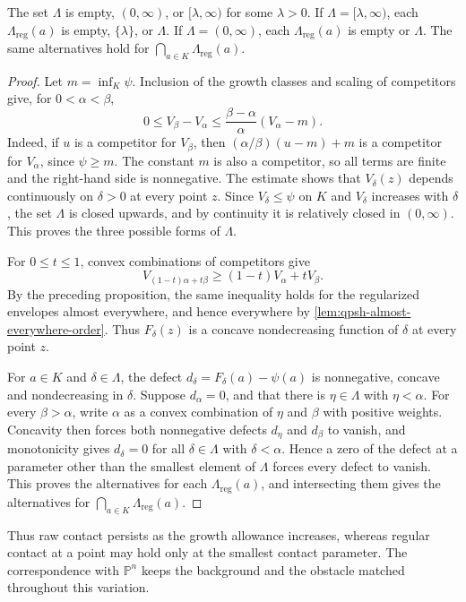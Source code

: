 \begin{theorem}\label{thm:affine-growth-contact-ray}
The set $\Lambda$ is empty, $(0,\infty)$, or $[\lambda,\infty)$ for some $\lambda>0$. If $\Lambda=[\lambda,\infty)$, each $\Lambda_{\mathrm{reg}}(a)$ is empty, $\{\lambda\}$, or $\Lambda$. If $\Lambda=(0,\infty)$, each $\Lambda_{\mathrm{reg}}(a)$ is empty or $\Lambda$. The same alternatives hold for $\bigcap_{a\in K}\Lambda_{\mathrm{reg}}(a)$.
\end{theorem}
\begin{proof}
Let $m=\inf_K\psi$. Inclusion of the growth classes and scaling of competitors give, for $0<\alpha<\beta$,
\begin{equation}\label{eq:affine-growth-raw-slope}
 0\leq V_\beta-V_\alpha
 \leq\frac{\beta-\alpha}{\alpha}(V_\alpha-m).
\end{equation}
Indeed, if $u$ is a competitor for $V_\beta$, then $(\alpha/\beta)(u-m)+m$ is a competitor for $V_\alpha$, since $\psi\geq m$. The constant $m$ is also a competitor, so all terms are finite and the right-hand side is nonnegative. The estimate shows that $V_\delta(z)$ depends continuously on $\delta>0$ at every point $z$. Since $V_\delta\leq\psi$ on $K$ and $V_\delta$ increases with $\delta$, the set $\Lambda$ is closed upwards, and by continuity it is relatively closed in $(0,\infty)$. This proves the three possible forms of $\Lambda$.

For $0\leq t\leq1$, convex combinations of competitors give
\[
 V_{(1-t)\alpha+t\beta}\geq(1-t)V_\alpha+tV_\beta.
\]
By the preceding proposition, the same inequality holds for the regularized envelopes almost everywhere, and hence everywhere by \cref{lem:qpsh-almost-everywhere-order}. Thus $F_\delta(z)$ is a concave nondecreasing function of $\delta$ at every point $z$.

For $a\in K$ and $\delta\in\Lambda$, the defect $d_\delta=F_\delta(a)-\psi(a)$ is nonnegative, concave and nondecreasing in $\delta$. Suppose $d_\alpha=0$, and that there is $\eta\in\Lambda$ with $\eta<\alpha$. For every $\beta>\alpha$, write $\alpha$ as a convex combination of $\eta$ and $\beta$ with positive weights. Concavity then forces both nonnegative defects $d_\eta$ and $d_\beta$ to vanish, and monotonicity gives $d_\delta=0$ for all $\delta\in\Lambda$ with $\delta<\alpha$. Hence a zero of the defect at a parameter other than the smallest element of $\Lambda$ forces every defect to vanish. This proves the alternatives for each $\Lambda_{\mathrm{reg}}(a)$, and intersecting them gives the alternatives for $\bigcap_{a\in K}\Lambda_{\mathrm{reg}}(a)$.
\end{proof}

Thus raw contact persists as the growth allowance increases, whereas regular contact at a point may hold only at the smallest contact parameter. The correspondence with $\mathbb P^n$ keeps the background and the obstacle matched throughout this variation.




